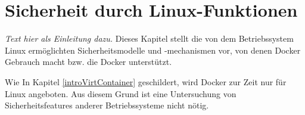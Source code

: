 \documentclass[../main.tex]{subfiles}
\begin{document}









\chapter{Sicherheit durch Linux-Funktionen}
\label{secLinux}
	\emph{Text hier als Einleitung dazu.}
	Dieses Kapitel stellt die von dem Betriebssystem Linux ermöglichten Sicherheitsmodelle und -mechanismen vor, von denen Docker Gebrauch macht bzw. die Docker unterstützt.

	Wie In Kapitel \ref{introVirtContainer} geschildert, wird Docker zur Zeit nur für Linux angeboten. Aus diesem Grund ist eine Untersuchung von Sicherheitsfeatures anderer Betriebssysteme nicht nötig.
\end{document}
